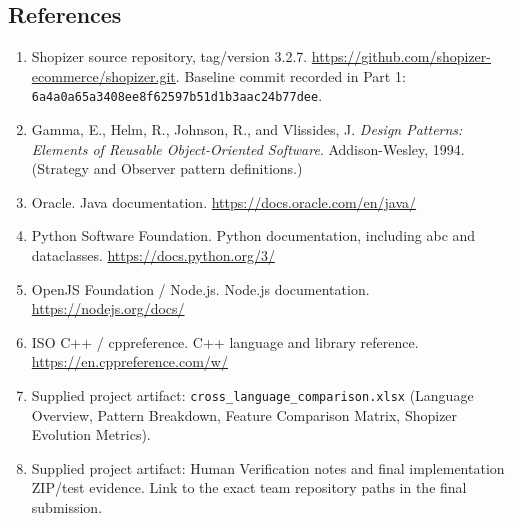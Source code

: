 \documentclass[11pt,a4paper]{article}
\begin{document}
\subsection*{References}
\begin{enumerate}[nosep]
  \item Shopizer source repository, tag/version 3.2.7. \url{https://github.com/shopizer-ecommerce/shopizer.git}. Baseline commit recorded in Part 1: \texttt{6a4a0a65a3408ee8f62597b51d1b3aac24b77dee}.
  \item Gamma, E., Helm, R., Johnson, R., and Vlissides, J. \textit{Design Patterns: Elements of Reusable Object-Oriented Software}. Addison-Wesley, 1994. (Strategy and Observer pattern definitions.)
  \item Oracle. Java documentation. \url{https://docs.oracle.com/en/java/}
  \item Python Software Foundation. Python documentation, including abc and dataclasses. \url{https://docs.python.org/3/}
  \item OpenJS Foundation / Node.js. Node.js documentation. \url{https://nodejs.org/docs/}
  \item ISO C++ / cppreference. C++ language and library reference. \url{https://en.cppreference.com/w/}
  \item Supplied project artifact: \texttt{cross\_\allowbreak{}language\_\allowbreak{}comparison.\allowbreak{}xlsx} (Language Overview, Pattern Breakdown, Feature Comparison Matrix, Shopizer Evolution Metrics).
  \item Supplied project artifact: Human Verification notes and final implementation ZIP/test evidence. Link to the exact team repository paths in the final submission.
\end{enumerate}
\end{document}
